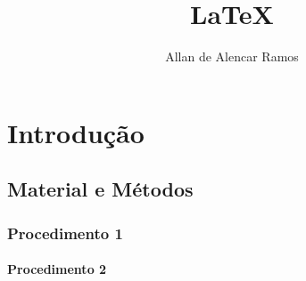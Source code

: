 \documentclass[12pt, a4paper, oneside]{book}
\begin{document}
\title{LaTeX}
\author{Allan de Alencar Ramos} 
\maketitle

\chapter*{Introdução}


\section*{Material e Métodos}

\subsection*{Procedimento 1}

\subsubsection{Procedimento 2}
\end{document}
